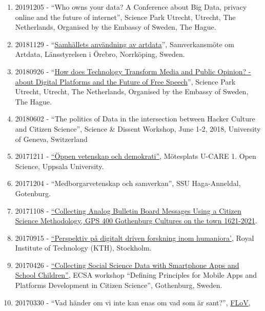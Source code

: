 \documentclass[
]{article}
\providecommand{\tightlist}{%
  \setlength{\itemsep}{0pt}\setlength{\parskip}{0pt}}
\begin{document}
\begin{enumerate}
\def\labelenumi{\arabic{enumi}.}
\tightlist
\item
  20191205 - ``Who owns your data? A Conference about Big Data, privacy
  online and the future of internet'', Science Park Utrecht, Utrecht,
  The Netherlands, Organised by the Embassy of Sweden, The Hague.
\item
  20181129 -
  ``\href{https://www.lansstyrelsen.se/orebro/kalenderhandelser---orebro/2018-10-16-samverkansmote-om-artdata.html}{Samhällets
  användning av artdata}'', Samverkansmöte om Artdata, Länsstyrelsen i
  Örebro, Norrköping, Sweden.
\item
  20180926 - ``\href{https://www.swedenabroad.se/free-speech}{How does
  Technology Transform Media and Public Opinion? - about Digital
  Platforms and the Future of Free Speech}'', Science Park Utrecht,
  Utrecht, The Netherlands, Organised by the Embassy of Sweden, The
  Hague.
\item
  20180602 - ``The politics of Data in the intersection between Hacker
  Culture and Citizen Science'', Science \& Dissent Workshop, June 1-2,
  2018, University of Geneva, Switzerland
\item
  20171211 -
  \href{http://www.u-care.uu.se/kalendarium/evenemang/?eventId=29958}{``Öppen
  vetenskap och demokrati''}, Mötesplats U-CARE 1. Open Science, Uppsala
  University.
\item
  20171204 - ``Medborgarvetenskap och samverkan'', SSU Haga-Anneldal,
  Gotenburg.
\item
  20171108 -
  \href{http://gps400.gu.se/digitalAssets/1662/1662945_gps400-conference_final-programme.pdf}{``Collecting
  Analog Bulletin Board Messages Using a Citizen Science Methodology,
  GPS 400 Gothenburg Cultures on the town 1621-2021}.
\item
  20170915 -
  \href{http://patriksv.net/2017/08/program-and-inbjudna-deltagare-15-september-pa-kth/}{``Perspektiv
  på digitalt driven forskning inom humaniora'}, Royal Institute of
  Technology (KTH), Stockholm.
\item
  20170426 -
  \href{https://ecsa.citizen-science.net/sites/default/files/draft_agenda_second_workshop_appsplatforms.pdf}{``Collecting
  Social Science Data with Smartphone Apps and School Children''}, ECSA
  workshop ``Defining Principles for Mobile Apps and Platforms
  Development in Citizen Science'', Gothenburg, Sweden.
\item
  20170330 - ``Vad händer om vi inte kan enas om vad som är sant?'',
  \href{http://flov.gu.se/aktuellt/Nyheter/fulltext//oppet-hus-pa-flov-med-panelsamtal-om-alternativa-fakta-och-informationsbubblor.cid1428426}{FLoV,
}
\end{enumerate}
\end{document}
